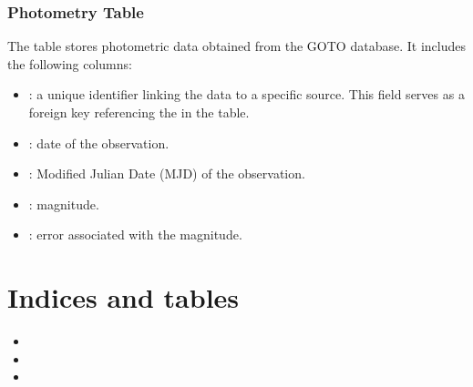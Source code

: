 \documentclass[letterpaper,10pt,english]{sphinxmanual}
\begin{document}
\subsection{Photometry Table}
\label{\detokenize{databases:photometry-table}}
\sphinxAtStartPar
The  table stores photometric data obtained from the GOTO database. It includes the following columns:
\begin{itemize}
\item {} 
\sphinxAtStartPar
{}: a unique identifier linking the data to a specific source. This field serves as a foreign key referencing the  in the  table.

\item {} 
\sphinxAtStartPar
{}: date of the observation.

\item {} 
\sphinxAtStartPar
{}: Modified Julian Date (MJD) of the observation.

\item {} 
\sphinxAtStartPar
{}: magnitude.

\item {} 
\sphinxAtStartPar
{}: error associated with the magnitude.

\end{itemize}


\chapter{Indices and tables}
\label{\detokenize{index:indices-and-tables}}\begin{itemize}
\item {} 
\sphinxAtStartPar
{}

\item {} 
\sphinxAtStartPar
{}

\item {} 
\sphinxAtStartPar
{}

\end{itemize}



\renewcommand{\indexname}{Index}
\printindex
\end{document}

